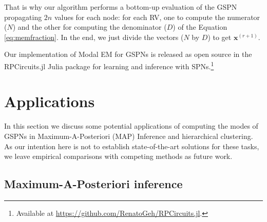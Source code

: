 \documentclass[12pt]{article}
\begin{document}
That is why our algorithm performs a bottom-up evaluation of the GSPN propagating $2n$ values for each node: for each RV, one to compute the numerator ($N$) and the other for computing the denominator ($D$) of the Equation \ref{eq:memfraction}. In the end, we just divide the vectors ($N$ by $D$) to get $\mathbf{x}^{(r+1)}$.

Our implementation of Modal EM for GSPNs is released as open source in the RPCircuits.jl Julia package for learning and inference with  SPNs.\footnote{Available at \url{https://github.com/RenatoGeh/RPCircuits.jl}.}

\section{Applications}
\label{sec:experiments}

In this section we discuss some potential  applications of computing the modes of GSPNs in Maximum-A-Posteriori (MAP) Inference and hierarchical clustering. 
As our intention here is not to establish state-of-the-art solutions for these tasks, we leave empirical comparisons with competing methods as future work.

\subsection{Maximum-A-Posteriori inference}
\label{subsec:map}
\end{document}
